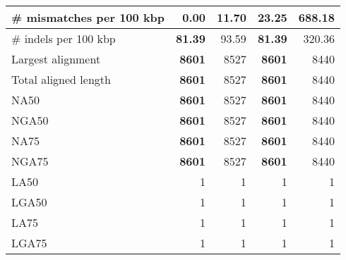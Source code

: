\documentclass[12pt,a4paper]{article}
\begin{document}
\begin{table}[ht]
\begin{center}
\begin{tabular}{|l*{4}{|r}|}
\# mismatches per 100 kbp & {\bf 0.00} & 11.70 & 23.25 & 688.18 \\ \hline
\# indels per 100 kbp & {\bf 81.39} & 93.59 & {\bf 81.39} & 320.36 \\ \hline
Largest alignment & {\bf 8601} & 8527 & {\bf 8601} & 8440 \\ \hline
Total aligned length & {\bf 8601} & 8527 & {\bf 8601} & 8440 \\ \hline
NA50 & {\bf 8601} & 8527 & {\bf 8601} & 8440 \\ \hline
NGA50 & {\bf 8601} & 8527 & {\bf 8601} & 8440 \\ \hline
NA75 & {\bf 8601} & 8527 & {\bf 8601} & 8440 \\ \hline
NGA75 & {\bf 8601} & 8527 & {\bf 8601} & 8440 \\ \hline
LA50 & 1 & 1 & 1 & 1 \\ \hline
LGA50 & 1 & 1 & 1 & 1 \\ \hline
LA75 & 1 & 1 & 1 & 1 \\ \hline
LGA75 & 1 & 1 & 1 & 1 \\ \hline
\end{tabular}
\end{center}
\end{table}
\end{document}

